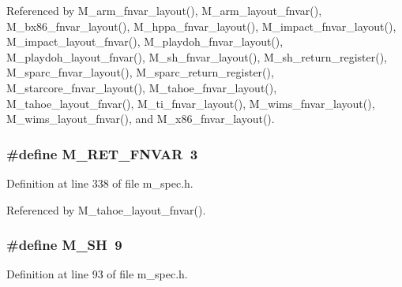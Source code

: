 Referenced by M\_\-arm\_\-fnvar\_\-layout(), M\_\-arm\_\-layout\_\-fnvar(), M\_\-bx86\_\-fnvar\_\-layout(), M\_\-hppa\_\-fnvar\_\-layout(), M\_\-impact\_\-fnvar\_\-layout(), M\_\-impact\_\-layout\_\-fnvar(), M\_\-playdoh\_\-fnvar\_\-layout(), M\_\-playdoh\_\-layout\_\-fnvar(), M\_\-sh\_\-fnvar\_\-layout(), M\_\-sh\_\-return\_\-register(), M\_\-sparc\_\-fnvar\_\-layout(), M\_\-sparc\_\-return\_\-register(), M\_\-starcore\_\-fnvar\_\-layout(), M\_\-tahoe\_\-fnvar\_\-layout(), M\_\-tahoe\_\-layout\_\-fnvar(), M\_\-ti\_\-fnvar\_\-layout(), M\_\-wims\_\-fnvar\_\-layout(), M\_\-wims\_\-layout\_\-fnvar(), and M\_\-x86\_\-fnvar\_\-layout().
\subsubsection{\setlength{\rightskip}{0pt plus 5cm}\#define M\_\-RET\_\-FNVAR~3}\label{m__spec_8h_da1c6b4532e1dea396b6b714d29b99b4}




Definition at line 338 of file m\_\-spec.h.

Referenced by M\_\-tahoe\_\-layout\_\-fnvar().
\subsubsection{\setlength{\rightskip}{0pt plus 5cm}\#define M\_\-SH~9}\label{m__spec_8h_eae52dc5940c62ef9c768bfa87b0fade}




Definition at line 93 of file m\_\-spec.h.

